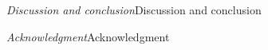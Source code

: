 \documentclass[aps,prl,reprint,superscriptaddress]{revtex4-2}
\begin{document}
\emph{Discussion and conclusion}\textemdash Discussion and conclusion

\emph{Acknowledgment}\textemdash Acknowledgment


%



%
\end{document}
